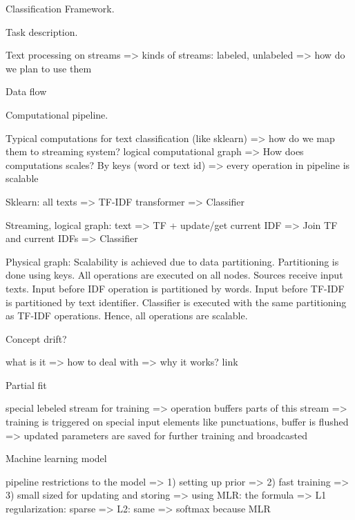 
Classification Framework.

Task description. 

Text processing on streams => kinds of streams: labeled, unlabeled => how do we plan to use them

Data flow 

Computational pipeline.

Typical computations for text classification (like sklearn) => how do we map them to streaming system? logical computational graph => How does computations scales? By keys (word or text id) => every operation in pipeline is scalable

Sklearn: all texts => TF-IDF transformer => Classifier

Streaming, logical graph: text => TF + update/get current IDF => Join TF and current IDFs => Classifier

Physical graph: Scalability is achieved due to data partitioning. Partitioning is done using keys. All operations are executed on all nodes. Sources receive input texts. Input before IDF operation is partitioned by words. Input before TF-IDF is partitioned by text identifier. Classifier is executed with the same partitioning as TF-IDF operations. Hence, all operations are scalable. 

Concept drift?

what is it => how to deal with => why it works? link

Partial fit

special lebeled stream for training => operation buffers parts of this stream => training is triggered on special input elements like punctuations, buffer is flushed => updated parameters are saved for further training and broadcasted

Machine learning model

pipeline restrictions to the model => 1) setting up prior => 2) fast training => 3) small sized for updating and storing => using MLR: the formula => L1 regularization: sparse => L2: same => softmax because MLR
